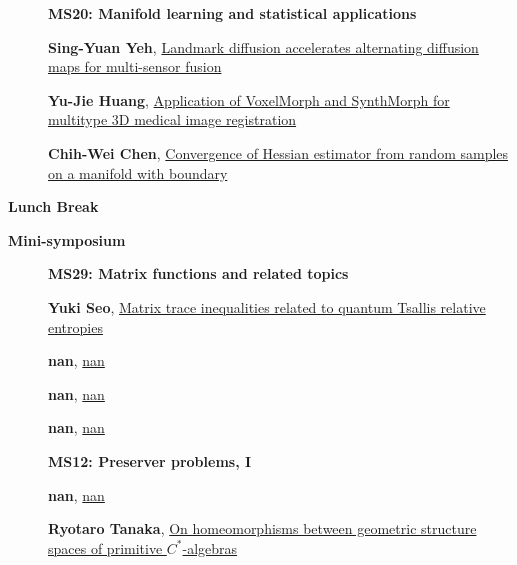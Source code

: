 \documentclass[ILAS2025-program.tex]{subfiles}
\begin{document}
\begin{description}
    \begin{description}
    \item[] {\color{mstitle}\textbf{MS20: Manifold learning and statistical applications}} 
    \item[] \hypertarget{up0150}{}\textbf{Sing-Yuan Yeh}, \hyperlink{down0150}{Landmark diffusion accelerates alternating diffusion maps for multi-sensor fusion}
        \item[] \hypertarget{up0151}{}\textbf{Yu-Jie Huang}, \hyperlink{down0151}{Application of VoxelMorph and SynthMorph for multitype 3D medical image registration}
        \item[] \hypertarget{up0152}{}\textbf{Chih-Wei Chen}, \hyperlink{down0152}{Convergence of Hessian estimator from random samples on a manifold with boundary}
        \end{description}
    \item[\info{12:00\textrm{--}13:30}] \textbf{Lunch Break} \info{}
    \item[\info{13:30\textrm{--}15:30}] \textbf{Mini-symposium} 
    \begin{description}
    \item[] {\color{mstitle}\textbf{MS29: Matrix functions and related topics}} 
    \item[] \hypertarget{up0157}{}\textbf{Yuki Seo}, \hyperlink{down0157}{Matrix trace inequalities related to quantum Tsallis relative entropies
}
        \item[] \hypertarget{up0158}{}\textbf{nan}, \hyperlink{down0158}{nan}
        \item[] \hypertarget{up0159}{}\textbf{nan}, \hyperlink{down0159}{nan}
        \item[] \hypertarget{up0160}{}\textbf{nan}, \hyperlink{down0160}{nan}
        \end{description}
    \begin{description}
    \item[] {\color{mstitle}\textbf{MS12: Preserver problems, I}} 
    \item[] \hypertarget{up0161}{}\textbf{nan}, \hyperlink{down0161}{nan}
        \item[] \hypertarget{up0162}{}\textbf{Ryotaro Tanaka}, \hyperlink{down0162}{On homeomorphisms between geometric structure spaces of primitive $C^*$-algebras}

\end{description}
\end{description}
\end{document}

